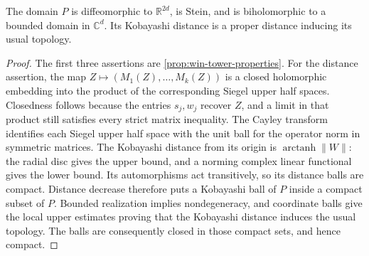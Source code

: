 \begin{lemma}\label{lem:quo-tower}
The domain $P$ is diffeomorphic to $\mathbb{R}^{2d}$, is Stein, and is biholomorphic to a bounded domain in $\mathbb{C}^d$. Its Kobayashi distance is a proper distance inducing its usual topology.
\end{lemma}
\begin{proof}
The first three assertions are \cref{prop:win-tower-properties}. For the distance assertion, the map $Z\mapsto(M_1(Z),\ldots,M_k(Z))$ is a closed holomorphic embedding into the product of the corresponding Siegel upper half spaces. Closedness follows because the entries $s_j,w_j$ recover $Z$, and a limit in that product still satisfies every strict matrix inequality. The Cayley transform identifies each Siegel upper half space with the unit ball for the operator norm in symmetric matrices. The Kobayashi distance from its origin is $\operatorname{arctanh}\|W\|$: the radial disc gives the upper bound, and a norming complex linear functional gives the lower bound. Its automorphisms act transitively, so its distance balls are compact. Distance decrease therefore puts a Kobayashi ball of $P$ inside a compact subset of $P$. Bounded realization implies nondegeneracy, and coordinate balls give the local upper estimates proving that the Kobayashi distance induces the usual topology. The balls are consequently closed in those compact sets, and hence compact.
\end{proof}

